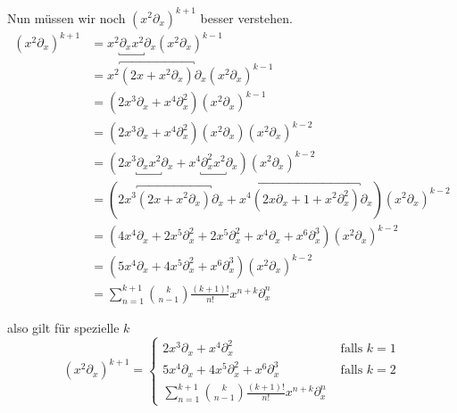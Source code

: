 Nun müssen wir noch $(x^2\partial_x)^{k+1}$ besser verstehen.
\begin{align*}
(x^2\partial_x)^{k+1} &=x^2\underbracket{\partial_xx^2}\partial_x
                        (x^2\partial_x)^{k-1}\\
                      &=x^2\overbracket{(2x+x^{2}\partial_x)}\partial_x
                        (x^2\partial_x)^{k-1}\\
                      &=(2x^3\partial_x+x^{4}\partial_x^2)
                        (x^2\partial_x)^{k-1}\\
                      &=(2x^3\partial_x+x^{4}\partial_x^2)(x^2\partial_x)
                        (x^2\partial_x)^{k-2}\\
                      &=(2x^3\underbracket{\partial_xx^2}\partial_x
                        +x^{4}\underbracket{\partial_x^2x^2}\partial_x)
                        (x^2\partial_x)^{k-2}\\
                      &=(2x^3\overbracket{(2x+x^{2}\partial_x)}\partial_x
                        +x^{4}\overbracket{(2x\partial_x+1+x^2\partial_x^2)}
                        \partial_x) (x^2\partial_x)^{k-2}\\
                      &=(4x^4\partial_x+2x^{5}\partial_x^2
                        +2x^{5}\partial_x^2
                        +x^4\partial_x
                        +x^6\partial_x^3)
                        (x^2\partial_x)^{k-2}\\
                      &=(5x^4\partial_x+4x^{5}\partial_x^2
                        +x^6\partial_x^3)
                        (x^2\partial_x)^{k-2}\\
                      &=\sum_{n=1}^{k+1}\binom{k}{n-1}\frac{(k+1)!}{n!}x^{n+k}
                        \partial_x^{n}
\end{align*}
\begin{comment}
Stirlingzahlen
\end{comment}
also gilt für spezielle $k$
\begin{equation} \label{eq:rezeptNeben1}
(x^2\partial_x)^{k+1}=
\begin{cases}
  2x^3\partial_x+x^{4}\partial_x^2 & \mbox{ falls } k=1\\
  5x^4\partial_x+4x^{5}\partial_x^2 +x^6\partial_x^3 & \mbox{ falls } k=2\\
  \sum_{n=1}^{k+1}\binom{k}{n-1}\frac{(k+1)!}{n!}x^{n+k} \partial_x^{n}
\end{cases}
\end{equation}

